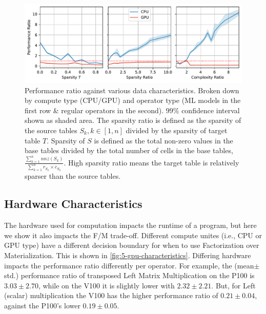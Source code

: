 \begin{figure}[ht]
    \centering
    \includegraphics[width=\linewidth]{chapters/05_cost_estimation/figures/motivation_perf_ratio_vs_data_chars.pdf}
    \caption[Performance ratio for various data characteristics]{Performance ratio against various data characteristics. Broken down by compute type (CPU/GPU) and operator type (ML models in the first row \& regular operators in the second). $99\%$ confidence interval shown as shaded area. The sparsity ratio is defined as the sparsity of the source tables $S_k, k\in[1,n]$ divided by the sparsity of target table $T$. Sparsity of $S$ is defined as the total non-zero values in the base tables divided by the total number of cells in the base tables, $\frac{\sum_{k=1}^{n} nnz(S_k)}{\sum_{k=1}^{n} r_{S_k} \times c_{S_k}}$. High sparsity ratio means the target table is relatively sparser than the source tables.}
    \label{fig:5-complexity-ratio-vs-data-chars}
\end{figure}

\subsection{Hardware Characteristics}
The hardware used for computation impacts the runtime of a program, but here we show it also impacts the F/M trade-off. Different compute unites (i.e., CPU or GPU type) have a different decision boundary for when to use Factorization over Materialization. This is shown in \autoref{fig:5-gpu-characteristics}. Differing hardware impacts the performance ratio differently per operator. For example, the (mean$\pm$std.) performance ratio of transposed Left Matrix Multiplication on the P100 is $3.03\pm2.70$, while on the V100 it is slightly lower with $2.32\pm2.21$. But, for Left (scalar) multiplication the V100 has the higher performance ratio of $0.21\pm0.04$, against the P100's lower $0.19\pm0.05$.

